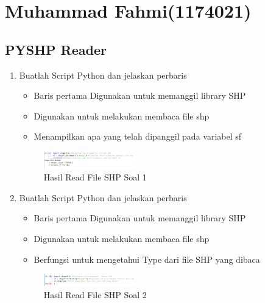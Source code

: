 \section{Muhammad Fahmi(1174021)}
\subsection{PYSHP Reader}
\begin{enumerate}
    \item Buatlah Script Python dan jelaskan perbaris
    
    \hfill\break
    \begin{itemize}
        \item Baris pertama Digunakan untuk memanggil library SHP
        \item Digunakan untuk melakukan membaca file shp
        \item Menampilkan apa yang telah dipanggil pada variabel sf
    \end{itemize}
    \hfill\break
    \begin{figure}[H]
		\includegraphics[width=4cm]{figures/1174021/3/soal1.PNG}
		\centering
		\caption{Hasil Read File SHP Soal 1}
    \end{figure}
    
    \item Buatlah Script Python dan jelaskan perbaris
    
    \hfill\break
    \begin{itemize}
        \item Baris pertama Digunakan untuk memanggil library SHP
        \item Digunakan untuk melakukan membaca file shp
        \item Berfungsi untuk mengetahui Type dari file SHP yang dibaca
    \end{itemize}
    \hfill\break
    \begin{figure}[H]
		\includegraphics[width=4cm]{figures/1174021/3/soal2.PNG}
		\centering
		\caption{Hasil Read File SHP Soal 2}
    \end{figure}


\end{enumerate}
